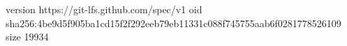 version https://git-lfs.github.com/spec/v1
oid sha256:4be9d5f905ba1cd15f2f292eeb79eb11331c088f745755aab6f0281778526109
size 19934
